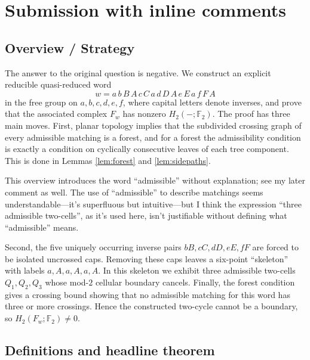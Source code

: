 \documentclass[12pt]{article}
\newcommand{\Ftwo}{\mathbb{F}_2}
\theoremstyle{definition}
\newcommand{\review}[1]{\begin{reviewbox}#1\end{reviewbox}}
\begin{document}
  \section{Submission with inline comments}


\date{}


\subsection*{Overview / Strategy}

The answer to the original question is negative.  We construct an explicit reducible quasi-reduced word
\[
w=a\,b\,B\,A\,c\,C\,a\,d\,D\,A\,e\,E\,a\,f\,F\,A
\]
in the free group on \(a,b,c,d,e,f\), where capital letters denote inverses, and prove that the associated complex \(F_w\) has nonzero \(H_2(-;\Ftwo)\).  The proof has three main moves.  First, planar topology implies that the subdivided crossing graph of every admissible matching is a forest, and for a forest the admissibility condition is exactly a condition on cyclically consecutive leaves of each tree component.  This is done in Lemmas \ref{lem:forest} and \ref{lem:sidepaths}.
\review{This overview introduces the word ``admissible'' without explanation; see my later comment as well. The use of ``admissible'' to describe matchings seems understandable---it's superfluous but intuitive---but I think the expression ``three admissible two-cells'', as it's used here, isn't justifiable without defining what ``admissible'' means.}

Second, the five uniquely occurring inverse pairs \(bB,cC,dD,eE,fF\) are forced to be isolated uncrossed caps.  Removing these caps leaves a six-point ``skeleton'' with labels \(a,A,a,A,a,A\).  In this skeleton we exhibit three admissible two-cells \(Q_1,Q_2,Q_3\) whose mod-\(2\) cellular boundary cancels.  Finally, the forest condition gives a crossing bound showing that no admissible matching for this word has three or more crossings.  Hence the constructed two-cycle cannot be a boundary, so \(H_2(F_w;\Ftwo)\neq 0\).

\subsection{Definitions and headline theorem}
\end{document}
